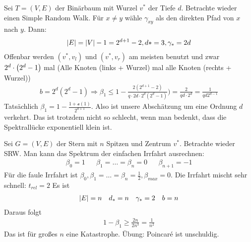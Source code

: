 \begin{beispiel}[Binärbaum]
	Sei $T = (V,E)$ der Binärbaum mit Wurzel $v^*$ der Tiefe $d$. Betrachte wieder einen Simple Random Walk. Für $x \neq y$ wähle $\gamma_{xy}$ als den direkten Pfad von $x$ nach $y$. Dann:
	\begin{align}
		\lvert E\rvert = \lvert V\rvert -1 = 2^{d+1} - 2, d* = 3, \gamma_* = 2d
	\end{align}
	Offenbar werden $(v^*,v_l)$ und $(v^*,v_r)$ am meisten benutzt  und zwar $2^d \cdot \left(2^d-1\right)$ mal (Alle Knoten (links + Wurzel) mal alle Knoten (rechts + Wurzel))
	\begin{align}
		b = 2^d(2^d-1) \Rightarrow \beta_1 \leq 1- \frac{2(2^{d+1} -2)}{q \cdot 2d \cdot 2^d(2^d-1)}) = \frac{2}{q d \cdot 2^d} = \frac{1}{q d 2^{d-1}}
	\end{align}
	Tatsächlich $\beta_1 = 1- \frac{1+ \mathcal{o}(1)}{2^{d+1}}$. Also ist unsere Abschätzung um eine Ordnung $d$ verkehrt. Das ist trotzdem nicht so schlecht, wenn man bedenkt, dass die Spektrallücke exponentiell klein ist.	
\end{beispiel}
\begin{beispiel}

	Sei $G = (V,E)$ der Stern mit $n$ Spitzen und Zentrum $v^*$. Betrachte wieder SRW. Man kann das Spektrum der einfachen Irrfahrt ausrechnen:
	\begin{align}
		\beta_0  = 1 && \beta_1 = \dots = \beta_n = 0 &&  \beta_{n+1} = -1
	\end{align}
	Für die faule Irrfahrt ist $\beta_0, \beta_1 = \dots = \beta_n = \frac{1}{2}, \beta_{max} = 0$. Die Irrfahrt mischt sehr schnell: $t_{rel} = 2$ Es ist
	\begin{align}
		\lvert E\rvert = n && d_* = n && \gamma_* = 2 && b = n 
	\end{align}
	Daraus folgt
	\begin{align}
		1 - \beta_1 \geq \frac{2n}{2n^3}= \frac{1}{n^2}
	\end{align}
	Das ist für großes $n$ eine Katastrophe. Übung: Poincaré ist unschuldig.
\end{beispiel}


